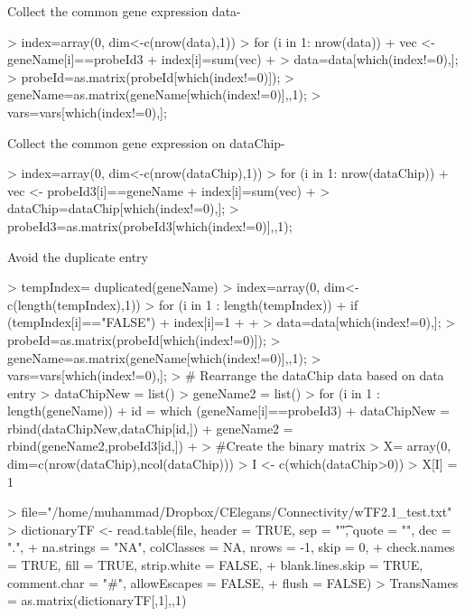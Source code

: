 \documentclass{article}
\begin{document}
Collect the common gene expression data-
\begin{Schunk}
\begin{Sinput}
> index=array(0, dim<-c(nrow(data),1))
> for (i in 1: nrow(data)){
+   vec <- geneName[i]==probeId3
+ 	index[i]=sum(vec)
+ }
> data=data[which(index!=0),];
> probeId=as.matrix(probeId[which(index!=0)]);
> geneName=as.matrix(geneName[which(index!=0)],,1);
> vars=vars[which(index!=0),];
\end{Sinput}
\end{Schunk}

Collect the common gene expression on dataChip-

\begin{Schunk}
\begin{Sinput}
> index=array(0, dim<-c(nrow(dataChip),1))
> for (i in 1: nrow(dataChip)){
+ 	vec <- probeId3[i]==geneName
+ 	index[i]=sum(vec)
+ }
> dataChip=dataChip[which(index!=0),];
> probeId3=as.matrix(probeId3[which(index!=0)],,1);
\end{Sinput}
\end{Schunk}

Avoid the duplicate entry
\begin{Schunk}
\begin{Sinput}
> tempIndex= duplicated(geneName)
> index=array(0, dim<-c(length(tempIndex),1))
> for (i in 1 : length(tempIndex)){
+ 	if (tempIndex[i]=="FALSE"){
+ 		index[i]=1
+ 	}
+ }
> data=data[which(index!=0),];
> probeId=as.matrix(probeId[which(index!=0)]);
> geneName=as.matrix(geneName[which(index!=0)],,1);
> vars=vars[which(index!=0),];
> # Rearrange the dataChip data based on data entry
> dataChipNew = list()
> geneName2 = list()
> for (i in 1 : length(geneName)){
+ 	id = which (geneName[i]==probeId3)
+ 	dataChipNew = rbind(dataChipNew,dataChip[id,])
+ 	geneName2 = rbind(geneName2,probeId3[id,])
+ }
> #Create the binary matrix
> X= array(0, dim=c(nrow(dataChip),ncol(dataChip)))
> I <- c(which(dataChip>0))
> X[I] = 1
\end{Sinput}
\end{Schunk}

\begin{Schunk}
\begin{Sinput}
> file="/home/muhammad/Dropbox/CElegans/Connectivity/wTF2.1_test.txt"
> dictionaryTF <- read.table(file, header = TRUE, sep = "\t", quote = "", dec = ".", 
+                 na.strings = "NA", colClasses = NA, nrows = -1, skip = 0, 
+                 check.names = TRUE, fill = TRUE, strip.white = FALSE, 
+                 blank.lines.skip = TRUE, comment.char = "#", allowEscapes = FALSE, 
+                 flush = FALSE)
> TransNames = as.matrix(dictionaryTF[,1],,1)
\end{Sinput}
\end{Schunk}
\end{document}
